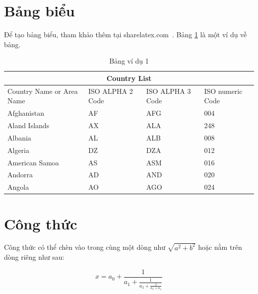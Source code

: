 \section{Bảng biểu}

Để tạo bảng biểu, tham khảo thêm tại sharelatex.com~\cite{Tables}. Bảng \ref{tab:vd1} là một ví dụ về bảng.

\begin{table}[ht]
	\caption{Bảng ví dụ 1}
	\label{tab:vd1}%
	\begin{center}
		\begin{tabular}{ |p{3cm}||p{3cm}|p{3cm}|p{3cm}|  }
			\hline
			\multicolumn{4}{|c|}{Country List} \\
			\hline
			Country Name     or Area Name& ISO ALPHA 2 Code &ISO ALPHA 3 Code&ISO numeric Code\\
			\hline
			Afghanistan   & AF    &AFG&   004\\
			Aland Islands&   AX  & ALA   &248\\
			Albania &AL & ALB&  008\\
			Algeria    &DZ & DZA&  012\\
			American Samoa&   AS  & ASM&016\\
			Andorra& AD  & AND   &020\\
			Angola& AO  & AGO&024\\
			\hline
		\end{tabular}
	\end{center}
\end{table}

\section{Công thức}

Công thức có thể chèn vào trong cùng một dòng như $ \sqrt{a^2+b^2} $ hoặc nằm trên dòng riêng như sau:

\begin{equation}
x = a_0 + \frac{1}{a_1 + \frac{1}{a_2 + \frac{1}{a_3 + a_4}}}
\end{equation}
